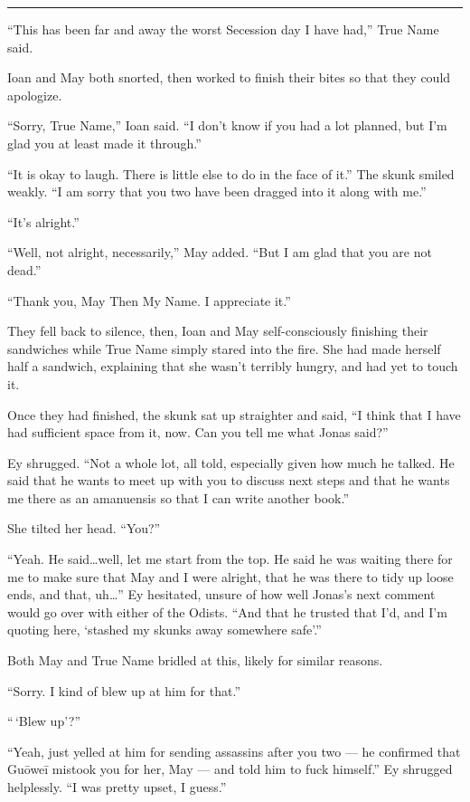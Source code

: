 \begin{center}\rule{0.5\linewidth}{0.5pt}\end{center}

``This has been far and away the worst Secession day I have had,'' True Name said.

Ioan and May both snorted, then worked to finish their bites so that they could apologize.

``Sorry, True Name,'' Ioan said. ``I don't know if you had a lot planned, but I'm glad you at least made it through.''

``It is okay to laugh. There is little else to do in the face of it.'' The skunk smiled weakly. ``I am sorry that you two have been dragged into it along with me.''

``It's alright.''

``Well, not alright, necessarily,'' May added. ``But I am glad that you are not dead.''

``Thank you, May Then My Name. I appreciate it.''

They fell back to silence, then, Ioan and May self-consciously finishing their sandwiches while True Name simply stared into the fire. She had made herself half a sandwich, explaining that she wasn't terribly hungry, and had yet to touch it.

Once they had finished, the skunk sat up straighter and said, ``I think that I have had sufficient space from it, now. Can you tell me what Jonas said?''

Ey shrugged. ``Not a whole lot, all told, especially given how much he talked. He said that he wants to meet up with you to discuss next steps and that he wants me there as an amanuensis so that I can write another book.''

She tilted her head. ``You?''

``Yeah. He said\ldots well, let me start from the top. He said he was waiting there for me to make sure that May and I were alright, that he was there to tidy up loose ends, and that, uh\ldots{}'' Ey hesitated, unsure of how well Jonas's next comment would go over with either of the Odists. ``And that he trusted that I'd, and I'm quoting here, `stashed my skunks away somewhere safe'.''

Both May and True Name bridled at this, likely for similar reasons.

``Sorry. I kind of blew up at him for that.''

``\,`Blew up'?''

``Yeah, just yelled at him for sending assassins after you two — he confirmed that Guōweī mistook you for her, May — and told him to fuck himself.'' Ey shrugged helplessly. ``I was pretty upset, I guess.''


